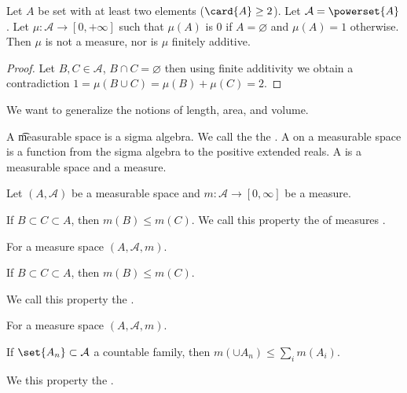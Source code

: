 \begin{expl}
Let $A$ be set with at least two elements ($\card{A} \geq 2$).
Let $\mathcal{A}  = \powerset{A}$.
Let $\mu : \mathcal{A}  \to [0, +\infty]$ such that $\mu (A)$ is $0$ if $A = \varnothing$ and $\mu (A) = 1$ otherwise.
Then $\mu $ is not a measure, nor is $\mu $ finitely additive.
\begin{proof}
Let $B, C \in \mathcal{A} $,
$B \cap C = \varnothing$
then using finite additivity
we obtain a contradiction
$
1 = \mu (B \cup C) = \mu (B) + \mu (C) = 2
$.
\end{proof}
\end{expl}


We want to generalize the notions of length, area, and volume.


A \t{measurable space}
is a sigma algebra.
We call the
the .
A
on a measurable space
is a function from the sigma algebra
to the positive extended reals.
A
is a measurable space and a measure.



\begin{prop}
Let $(A, \mathcal{A} )$ be a measurable space and
$m: \mathcal{A}  \to [0, \infty]$ be a measure.

If $B \subset C \subset A$, then $m(B) \leq m(C)$.
We call this property the of measures
.
\end{prop}

\begin{prop}
For a measure space $(A, \mathcal{A} , m)$.

If $B \subset C \subset A$, then $m(B) \leq m(C)$.

We call this property the
.
\end{prop}

\begin{prop}
For a measure space $(A, \mathcal{A} , m)$.

If $\set{A_n} \subset \mathcal{A} $ a countable family,
then $m(\cup A_n) \leq \sum_{i} m(A_i)$.

We this property the
.
\end{prop}

